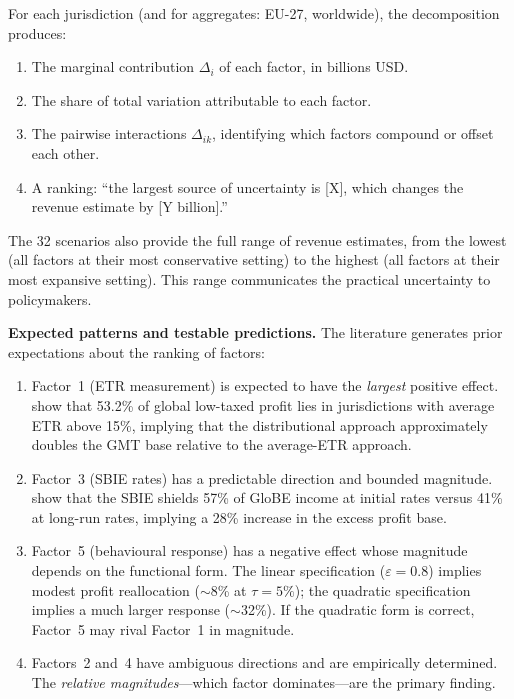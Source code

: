 \documentclass[11pt,a4paper]{article}
\begin{document}
For each jurisdiction (and for aggregates: EU-27, worldwide), the decomposition produces:

\begin{enumerate}
\item The marginal contribution $\Delta_i$ of each factor, in billions USD.
\item The share of total variation attributable to each factor.
\item The pairwise interactions $\Delta_{ik}$, identifying which factors compound or offset each other.
\item A ranking: ``the largest source of uncertainty is [X], which changes the revenue estimate by [Y billion].''
\end{enumerate}

The 32 scenarios also provide the full range of revenue estimates, from the lowest (all factors at their most conservative setting) to the highest (all factors at their most expansive setting). This range communicates the practical uncertainty to policymakers.

\textbf{Expected patterns and testable predictions.} The literature generates prior expectations about the ranking of factors:

\begin{enumerate}
\item Factor~1 (ETR measurement) is expected to have the \emph{largest} positive effect. \citet{hugger2025} show that 53.2\% of global low-taxed profit lies in jurisdictions with average ETR above 15\%, implying that the distributional approach approximately doubles the GMT base relative to the average-ETR approach.
\item Factor~3 (SBIE rates) has a predictable direction and bounded magnitude. \citet{devereux2023} show that the SBIE shields 57\% of GloBE income at initial rates versus 41\% at long-run rates, implying a 28\% increase in the excess profit base.
\item Factor~5 (behavioural response) has a negative effect whose magnitude depends on the functional form. The linear specification ($\varepsilon = 0.8$) implies modest profit reallocation ($\sim$8\% at $\tau = 5\%$); the quadratic specification implies a much larger response ($\sim$32\%). If the quadratic form is correct, Factor~5 may rival Factor~1 in magnitude.
\item Factors~2 and~4 have ambiguous directions and are empirically determined. The \emph{relative magnitudes}---which factor dominates---are the primary finding.
\end{enumerate}
\end{document}
